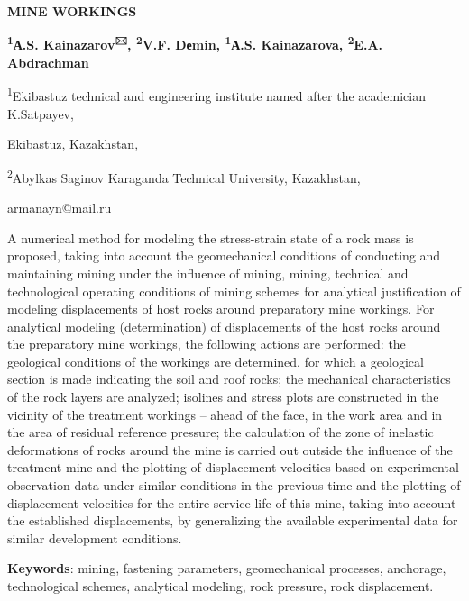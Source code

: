 {\bfseries MINE WORKINGS}

{\bfseries \textsuperscript{1}А.S. Kainazarov\textsuperscript{🖂},
\textsuperscript{2}V.F. Dеmin, \textsuperscript{1}А.S. Kainazarova,
\textsuperscript{2}E.A. Abdrachman}

\textsuperscript{1}Ekibastuz technical and engineering institute named
after the academician K.Satpayev,

Ekibastuz, Kazakhstan,

\textsuperscript{2}Abylkas Saginov Karaganda Technical University,
Kazakhstan,

armanayn@mail.ru

A numerical method for modeling the stress-strain state of a rock mass
is proposed, taking into account the geomechanical conditions of
conducting and maintaining mining under the influence of mining, mining,
technical and technological operating conditions of mining schemes for
analytical justification of modeling displacements of host rocks around
preparatory mine workings. For analytical modeling (determination) of
displacements of the host rocks around the preparatory mine workings,
the following actions are performed: the geological conditions of the
workings are determined, for which a geological section is made
indicating the soil and roof rocks; the mechanical characteristics of
the rock layers are analyzed; isolines and stress plots are constructed
in the vicinity of the treatment workings -- ahead of the face, in the
work area and in the area of residual reference pressure; the
calculation of the zone of inelastic deformations of rocks around the
mine is carried out outside the influence of the treatment mine and the
plotting of displacement velocities based on experimental observation
data under similar conditions in the previous time and the plotting of
displacement velocities for the entire service life of this mine, taking
into account the established displacements, by generalizing the
available experimental data for similar development conditions.

{\bfseries Keywords}: mining, fastening parameters, geomechanical
processes, anchorage, technological schemes, analytical modeling, rock
pressure, rock displacement.

